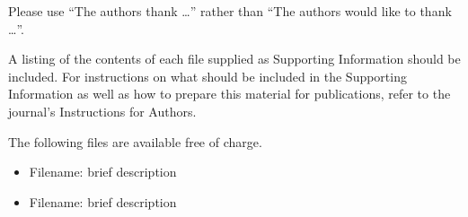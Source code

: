 \documentclass[journal=acsnano,manuscript=article]{achemso}
\begin{document}
\begin{acknowledgement}

Please use ``The authors thank \ldots'' rather than ``The
authors would like to thank \ldots''.

\end{acknowledgement}

\begin{suppinfo}

A listing of the contents of each file supplied as Supporting Information
should be included. For instructions on what should be included in the
Supporting Information as well as how to prepare this material for
publications, refer to the journal's Instructions for Authors.

The following files are available free of charge.
\begin{itemize}
  \item Filename: brief description
  \item Filename: brief description
\end{itemize}

\end{suppinfo}


\end{document}
